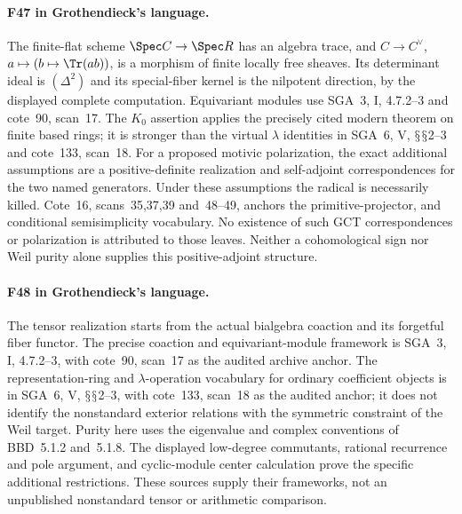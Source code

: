 \documentclass[11pt,a4paper]{article}
\renewcommand{\S}{\ensuremath{\mathsection}}
\newcommand{\fid}[1]{\textsf{#1}}\newcommand{\gate}[1]{\textsf{#1}}
\theoremstyle{named}\newtheorem{finding}{Finding}[section]
\theoremstyle{definition}\newtheorem{definition}[finding]{Definition}
\theoremstyle{remark}\newtheorem{remark}[finding]{Remark}
\begin{document}
\paragraph{\fid{F47} in Grothendieck's language.}
The finite-flat scheme $\Spec C\to\Spec R$ has an algebra trace,
and $C\to C^\vee$, $a\mapsto(b\mapsto\Tr(ab))$, is a morphism
of finite locally free sheaves. Its determinant ideal is
$(\Delta^2)$ and its special-fiber kernel is the nilpotent
direction, by the displayed complete computation. Equivariant
modules use SGA~3, I, 4.7.2--3 and cote~90, scan~17.
The $K_0$ assertion applies the precisely cited modern theorem
on finite based rings; it is stronger than the virtual
$\lambda$ identities in SGA~6, V, \S\S2--3 and cote~133,
scan~18. For a proposed motivic polarization, the exact
additional assumptions are a positive-definite realization and
self-adjoint correspondences for the two named generators.
Under these assumptions the radical is necessarily killed.
Cote~16, scans~35,37,39 and~48--49, anchors the primitive-projector,
and conditional semisimplicity vocabulary. No
existence of such GCT correspondences or polarization is
attributed to those leaves. Neither a cohomological sign nor
Weil purity alone supplies this positive-adjoint structure.



\paragraph{\fid{F48} in Grothendieck's language.}
The tensor realization starts from the actual bialgebra
coaction and its forgetful fiber functor. The precise
coaction and equivariant-module framework is SGA~3,
I, 4.7.2--3, with cote~90, scan~17 as the audited archive
anchor. The representation-ring and $\lambda$-operation
vocabulary for ordinary coefficient objects is in
SGA~6, V, \S\S2--3, with cote~133, scan~18 as the audited anchor;
it does not identify the nonstandard exterior relations
with the symmetric constraint of the Weil target.
Purity here uses the eigenvalue and complex conventions
of BBD~5.1.2 and~5.1.8.
The displayed low-degree commutants, rational recurrence
and pole argument, and cyclic-module center calculation
prove the specific additional restrictions.
These sources supply their frameworks, not an unpublished
nonstandard tensor or arithmetic comparison.
\end{document}
